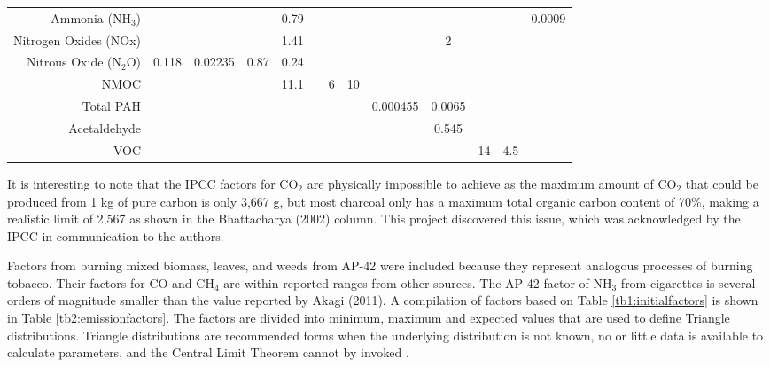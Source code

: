 \begin{sidewaystable}
\begin{table}[H]
{\begin{tabular}{@{}rcccccccccccc@{}}
Ammonia (NH$_{3}$) &  &  &  & 0.79 &  &  &  &  &  &  &  & 0.0009 \\
Nitrogen Oxides (NOx) &  &  &  & 1.41 &  &  &  &  & 2 &  &  &  \\
Nitrous Oxide (N$_{2}$O) & 0.118 & 0.02235 & 0.87 & 0.24 &  &  &  &  &  &  &  &  \\
NMOC &  &  &  & 11.1 &  & 6 & 10 &  &  &  &  &  \\
Total PAH &  &  &  &  &  &  &  & 0.000455 & 0.0065 &  &  &  \\
Acetaldehyde &  &  &  &  &  &  &  &  & 0.545 &  &  &  \\
VOC &  &  &  &  &  &  &  &  &  & 14 & 4.5 &  \\ \bottomrule
\end{tabular}
} %
\end{table}     
\end{sidewaystable}

It is interesting to note that the IPCC factors for CO$_{2}$ are physically impossible to achieve as the maximum amount of CO$_{2}$ that could be produced from 1 kg of pure carbon is only 3,667 g, but most charcoal only has a maximum total organic carbon content of 70\%, making a realistic limit of 2,567 as shown in the Bhattacharya (2002) column.  This project discovered this issue, which was acknowledged by the IPCC in communication to the authors. 

Factors from burning mixed biomass, leaves, and weeds from AP-42 were included because they represent analogous processes of burning tobacco.  Their factors for CO and CH$_{4}$ are within reported ranges from other sources.  The AP-42 factor of NH$_{3}$ from cigarettes is several orders of magnitude smaller than the value reported by Akagi (2011). A compilation of factors based on Table \ref{tb1:initialfactors} is shown in Table \ref{tb2:emissionfactors}. The factors are divided into minimum, maximum and expected values that are used to define Triangle distributions. Triangle distributions are recommended forms when the underlying distribution is not known, no or little data is available to calculate parameters, and the Central Limit Theorem cannot by invoked \citep{Firestone1997, Lipton1995, Salling2008}. 

